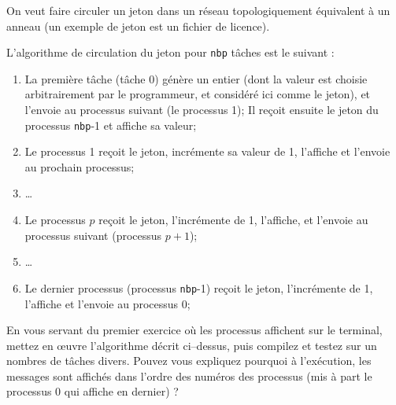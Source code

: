 \documentclass[11pt,a4paper]{article}
\begin{document}
On veut faire circuler un jeton dans un réseau topologiquement équivalent
à un anneau (un exemple de jeton est un fichier de licence).

L'algorithme de circulation du jeton pour \texttt{nbp} tâches est le suivant :
\begin{enumerate}
\item La première tâche (tâche 0) génère un entier (dont la valeur est choisie arbitrairement par le
  programmeur, et considéré ici comme le jeton), et l'envoie au processus suivant (le processus 1);
  Il reçoit ensuite le jeton du processus \texttt{nbp}-1 et affiche sa valeur;
\item Le processus 1 reçoit le jeton, incrémente sa valeur de 1, l'affiche et l'envoie au prochain processus;
\item \ldots
\item Le processus $p$ reçoit le jeton, l'incrémente de 1, l'affiche, et l'envoie au processus suivant
(processus $p+1$);
\item \ldots
\item Le dernier processus (processus \texttt{nbp}-1) reçoit le jeton, l'incrémente de 1, l'affiche et
  l'envoie au processus 0;
\end{enumerate}

En vous servant du premier exercice où les processus affichent sur le terminal, 
mettez en {\oe}uvre l'algorithme décrit ci--dessus, puis compilez et testez sur un nombres de tâches divers.
Pouvez vous expliquez pourquoi à l'exécution, les messages sont affichés dans l'ordre des numéros des processus
(mis à part le processus 0 qui affiche en dernier) ?

\end{document}
